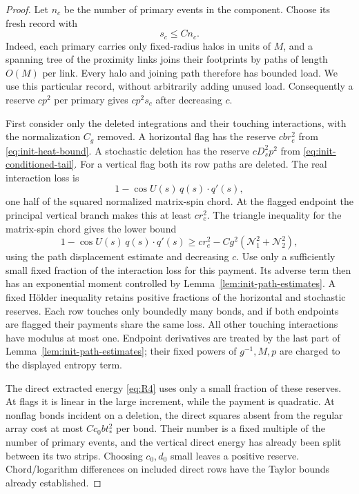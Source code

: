 \begin{proof}
Let $n_c$ be the number of primary events in the component.  Choose its
fresh record with
\[
 s_c\le C n_c.
\]
Indeed, each primary carries only fixed-radius halos in units of $M$,
and a spanning tree of the proximity links joins their footprints by
paths of length $O(M)$ per link.  Every halo and joining path therefore
has bounded load.  We use this particular record, without arbitrarily
adding unused load.  Consequently a reserve $cp^2$ per primary gives
$cp^2s_c$ after decreasing $c$.

First consider only the deleted integrations and their touching
interactions, with the normalization $C_g$ removed.  A horizontal flag
has the reserve $cb r_e^2$ from \eqref{eq:init-heat-bound}.  A stochastic
deletion has the reserve $cD_s^2p^2$ from
\eqref{eq:init-conditioned-tail}.  For a vertical flag both its row
paths are deleted.  The real interaction loss is
\[
 1-\cos U(s)\,q(s)\cdot q'(s),
\]
one half of the squared normalized matrix-spin chord.  At the flagged
endpoint the principal vertical branch makes this at least $cr_e^2$.
The triangle inequality for the matrix-spin chord gives the lower bound
\[
 1-\cos U(s)\,q(s)\cdot q'(s)
 \ge cr_e^2-Cg^2(\mathcal N_1^2+\mathcal N_2^2),
\]
using the path displacement estimate and decreasing $c$.
Use only a sufficiently small fixed fraction of the interaction loss
for this payment.  Its adverse term then has an exponential moment
controlled by Lemma~\ref{lem:init-path-estimates}.  A fixed H\"older
inequality retains positive fractions of the horizontal and stochastic
reserves.  Each row touches only boundedly many bonds, and if both
endpoints are flagged their payments share the same loss.  All other
touching interactions have modulus at most one.  Endpoint derivatives
are treated by the last part of Lemma~\ref{lem:init-path-estimates};
their fixed powers of $g^{-1},M,p$ are charged to the displayed entropy
term.

The direct extracted energy \eqref{eq:R4} uses only a small fraction of
these reserves.  At flags it is linear in the large increment, while
the payment is quadratic.  At nonflag bonds incident on a deletion,
the direct squares absent from the regular array cost at most
$Cc_0bt_*^2$ per bond.  Their number is a fixed multiple of the number
of primary events, and the vertical direct energy has already been
split between its two strips.  Choosing $c_0,d_0$ small leaves a positive
reserve.  Chord/logarithm differences on included direct rows have the
Taylor bounds already established.


\end{proof}
